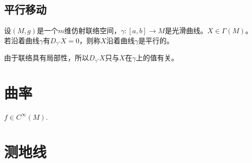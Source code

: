    \section{平行移动}
    \begin{definition}
        设$(M,g)$是一个$m$维仿射联络空间，$\gamma:[a,b]\to M$是光滑曲线。$X \in \Gamma(M)$。若沿着曲线$\gamma$有$D_{\gamma'}X=0$，则称$X$沿着曲线$\gamma$是平行的。
    \end{definition}
    由于联络具有局部性，所以$D_{\gamma'}X$只与$X$在$\gamma$上的值有关。

    \chapter{曲率}
    $f \in C^{\infty}(M)$.
    \chapter{测地线}

    
